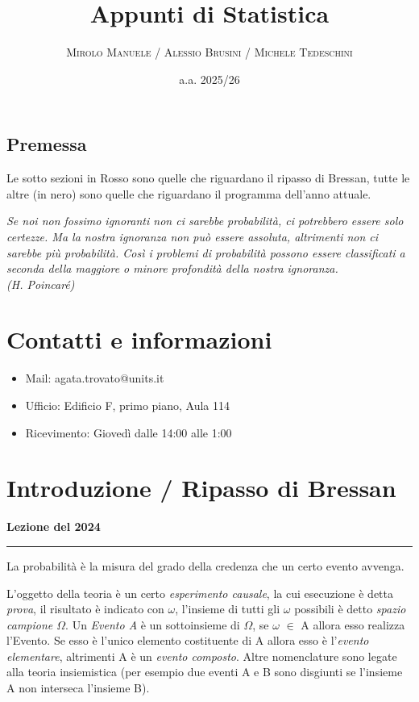 \documentclass{article}
\title{\textbf{\Huge Appunti di Statistica}}
\author{\textsc{Mirolo Manuele / Alessio Brusini / Michele Tedeschini}}
\date{a.a. 2025/26}
\theoremstyle{remark}
\newcommand{\thelezione}{}
\newcommand{\lezione}[2]{
\newpage
\renewcommand{\thelezione}{#2} 
\section{#1} 
\noindent\textbf{\color{RoyalBlue}Lezione del #2}\par\vspace{0.5em}\hrule\vspace{1em}
}
\begin{document}
\maketitle
\justifying

\newpage 
\begin{center}
\section*{Premessa}
Le sotto sezioni in Rosso sono quelle che riguardano il ripasso di Bressan, tutte le altre (in nero) sono quelle che riguardano il programma dell'anno attuale.    
\end{center}

\tableofcontents
\newpage

\textit{Se noi non fossimo ignoranti non ci sarebbe probabilità, ci potrebbero essere solo certezze. Ma la
nostra ignoranza non può essere assoluta, altrimenti non ci sarebbe più probabilità. Così i problemi di
probabilità possono essere classificati a seconda della maggiore o minore profondità della nostra
ignoranza.\\
(H. Poincaré)}

\setcounter{section}{-1}
\section{Contatti e informazioni}
\begin{itemize}
    \item Mail: agata.trovato@units.it
    \item Ufficio: Edificio F, primo piano, Aula 114
    \item Ricevimento: Giovedì dalle 14:00 alle 1:00
\end{itemize}

\lezione{Introduzione / Ripasso di Bressan}{2024}

La probabilità è la misura del grado della credenza che un certo evento avvenga.

L'oggetto della teoria è un certo \textit{esperimento causale}, la cui esecuzione è detta \textit{prova}, il risultato è indicato con \textit{$\omega$}, l'insieme di
tutti gli $\omega$ possibili è detto \textit{spazio campione $\Omega$}. Un \textit{Evento A} è un sottoinsieme di $\Omega$, se $\omega$ $\in$ A allora esso realizza l'Evento.
Se esso è l'unico elemento costituente di A allora esso è l'\textit{evento elementare}, altrimenti A è un \textit{evento composto}.
Altre nomenclature sono legate alla teoria insiemistica (per esempio due eventi A e B sono disgiunti se l'insieme A non interseca l'insieme B).
\end{document}
